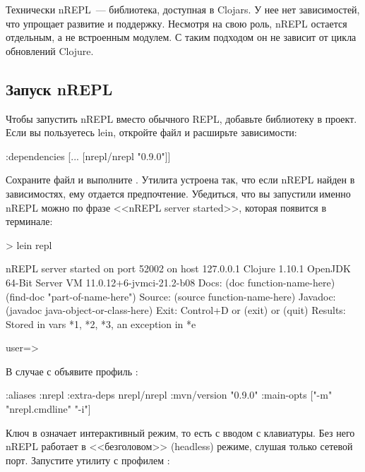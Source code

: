 Технически nREPL~--- библиотека, доступная в Clojars. У нее нет зависимостей, что упрощает развитие и поддержку. Несмотря на свою роль, nREPL остается отдельным, а не встроенным модулем. С таким подходом он не зависит от цикла обновлений Clojure.

\subsection{Запуск nREPL}

Чтобы запустить nREPL вместо обычного REPL, добавьте библиотеку в проект. Если вы пользуетесь lein, откройте файл  и расширьте зависимости:

\begin{english}
  \begin{clojure}
{:dependencies
 [... [nrepl/nrepl "0.9.0"]]}
  \end{clojure}
\end{english}

Сохраните файл и выполните . Утилита  устроена так, что если nREPL найден в зависимостях, ему отдается предпочтение. Убедиться, что вы запустили именно nREPL можно по фразе <<nREPL server started>>, которая появится в терминале:

\begin{english}
  \begin{text}
> lein repl

nREPL server started on port 52002 on host 127.0.0.1
Clojure 1.10.1
OpenJDK 64-Bit Server VM 11.0.12+6-jvmci-21.2-b08
    Docs: (doc function-name-here)
          (find-doc "part-of-name-here")
  Source: (source function-name-here)
 Javadoc: (javadoc java-object-or-class-here)
    Exit: Control+D or (exit) or (quit)
 Results: Stored in vars *1, *2, *3, an exception in *e

user=>
  \end{text}
\end{english}

В случае с  объявите профиль :

\begin{english}
  \begin{clojure/lines}
{:aliases
 {:nrepl
  {:extra-deps
   {nrepl/nrepl {:mvn/version "0.9.0"}}
   :main-opts ["-m" "nrepl.cmdline" "-i"]}}}
  \end{clojure/lines}
\end{english}

Ключ  в   означает интерактивный режим, то есть с вводом с клавиатуры. Без него nREPL работает в <<безголовом>> (headless) режиме, слушая только сетевой порт. Запустите утилиту  с профилем :

